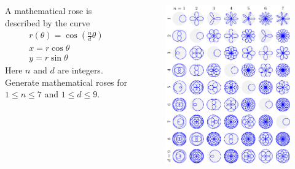 \begin{frame}
    \begin{columns}
        \begin{column}{0.4\linewidth}
            \begin{exercise}
                A mathematical rose is described by the curve
                \begin{gather*}
                    r(\theta) = \cos \left( \frac{n}{d} \theta \right)\\
                    x = r \cos \theta \\
                    y = r \sin \theta
                \end{gather*}
                Here $n$ and $d$ are integers.\\[1em]
                Generate mathematical roses for $1 \le n \le 7$ and $1 \le d \le 9$.\\[0.5em]
            \end{exercise}
        \end{column}
        \begin{column}{0.59\linewidth}
            \begin{figure}
                \includegraphics[width=\linewidth]{figures/math_roses}
            \end{figure}
        \end{column}
    \end{columns}
\end{frame}

